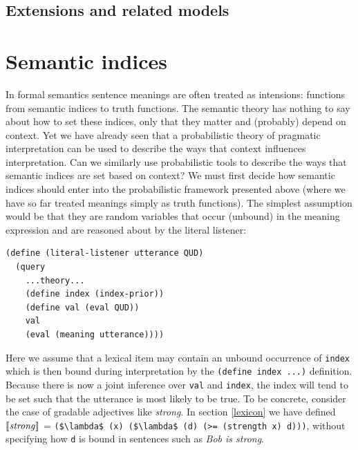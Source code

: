 \documentclass[pdfextras]{handbook}
\newcommand{\llbracket}{\ensuremath{\left [\!\left [}}%
\newcommand{\rrbracket}{\ensuremath{\right ]\!\right ]}}
\providecommand{\sv}[1]{\ensuremath{\llbracket \mathit{#1} \rrbracket}}
\begin{document}
\subsection{Extensions and related models}




\section{Semantic indices}
\label{indices}

In formal semantics \cite{montague} sentence meanings are often treated as intensions: functions from semantic indices to truth functions. The semantic theory has nothing to say about how to set these indices, only that they matter and (probably) depend on context. Yet we have already seen that a probabilistic theory of pragmatic interpretation can be used to describe the ways that context influences interpretation. Can we similarly use probabilistic tools to describe the ways that semantic indices are set based on context?
We must first decide how semantic indices should enter into the probabilistic framework presented above (where we have so far treated meanings simply as truth functions). The simplest assumption would be that they are random variables that occur (unbound) in the meaning expression and are reasoned about by the literal listener:
\begin{lstlisting}
(define (literal-listener utterance QUD)
  (query
    ...theory...
    (define index (index-prior))
    (define val (eval QUD))
    val
    (eval (meaning utterance))))
\end{lstlisting}
Here we assume that a lexical item may contain an unbound occurrence of \lstinline{index} which is then bound during interpretation by  the \lstinline{(define index ...)} definition.
Because there is now a joint inference over \lstinline{val} and \lstinline{index}, the index will tend to be set such that the utterance is most likely to be true. 
To be concrete, consider the case of gradable adjectives like \emph{strong}. In section \ref{lexicon} we have defined \sv{\mathit{strong}} = \lstinline[mathescape]{($\lambda$ (x) ($\lambda$ (d) (>= (strength x) d)))}, without specifying how \lstinline{d} is bound in sentences such as \emph{Bob is strong}.
\end{document}
